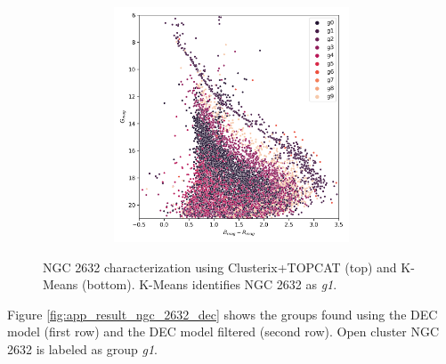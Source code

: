 \documentclass[11pt,a4paper,english,twocolumn]{article}
\begin{document}
\begin{figure}[htbp]
\begin{subfigure}{\columnwidth}
\begin{subfigure}[t]{0.30\textwidth}
    \end{subfigure}
    \hfill
    \begin{subfigure}[t]{0.30\textwidth}
      \centering
      \includegraphics[width=\textwidth]{../figures/ngc_2632/kmeans_hr_diagram_ngc_2632.png}
    \end{subfigure}
  \end{subfigure}
  \caption{NGC 2632 characterization using Clusterix+TOPCAT (top) and K-Means (bottom).
           K-Means identifies NGC 2632 as \emph{g1}.}
  \label{fig:app_result_ngc_2632_clusterix_kmeans}
\end{figure}

Figure \ref{fig:app_result_ngc_2632_dec} shows the groups found using
the DEC model (first row) and the DEC model filtered (second row).
Open cluster NGC 2632 is labeled as group \emph{g1}.
\end{document}
